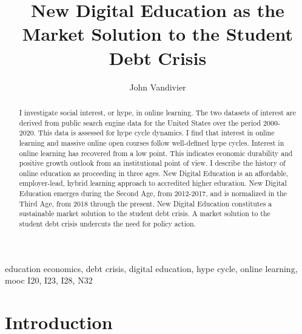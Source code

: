 \documentclass[review]{elsarticle}
\begin{document}
\begin{frontmatter}

    \title{
        New Digital Education as the Market Solution to the Student Debt Crisis
    }


    \author[mymainaddress]{John Vandivier}
    \address[mymainaddress]{4400 University Dr, Fairfax, VA 22030}

    \begin{abstract}
        I investigate social interest, or hype, in online learning.
        The two datasets of interest are derived from public search engine data for the United States over the period 2000-2020.
        This data is assessed for hype cycle dynamics.
        I find that interest in online learning and massive online open courses follow well-defined hype cycles.
        Interest in online learning has recovered from a low point.
        This indicates economic durability and positive growth outlook from an institutional point of view.
        I describe the history of online education as proceeding in three ages.
        New Digital Education is an affordable, employer-lead, hybrid learning approach to accredited higher education.
        New Digital Education emerges during the Second Age, from 2012-2017, and is normalized in the Third Age, from 2018 through the present.
        New Digital Education constitutes a sustainable market solution to the student debt crisis.
        A market solution to the student debt crisis undercuts the need for policy action.
    \end{abstract}

    \begin{keyword}
        education economics, debt crisis, digital education, hype cycle, online learning, mooc
        \MSC[2010] I20, I23, I28, N32
    \end{keyword}

\end{frontmatter}

\pagebreak
\linenumbers

\section{Introduction}
\end{document}
